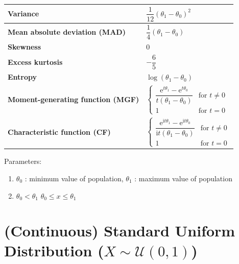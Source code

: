 \begin{alternateColorTable}
\begin{longtable}{|m{6cm}|p{9cm}|}
    \textbf{Variance} &
    ${\displaystyle {\dfrac {1}{12}}(\theta_1-\theta_0)^{2}}$
    \\[1ex] \hline

    \textbf{Mean absolute deviation (MAD)} &
    ${\displaystyle {\dfrac {1}{4}}(\theta_1-\theta_0)}$
    \\[1ex] \hline

    \textbf{Skewness} &
    $0$
    \\ \hline

    \textbf{Excess kurtosis} &
    ${\displaystyle -{\dfrac {6}{5}}}$
    \\[1ex] \hline

    \textbf{Entropy} &
    ${\displaystyle \log(\theta_1-\theta_0)}$
    \\[1ex] \hline

    \textbf{Moment-generating function (MGF)} &
    ${\displaystyle {\begin{cases}{\dfrac {\mathrm {e} ^{t\theta_1}-\mathrm {e} ^{t\theta_0}}{t(\theta_1-\theta_0)}}&{\text{for }}t\neq 0\\1&{\text{for }}t=0\end{cases}}}$
    \\[1ex] \hline

    \textbf{Characteristic function (CF)} &
    ${\displaystyle {\begin{cases}{\dfrac {\mathrm {e} ^{\mathrm {i} t\theta_1}-\mathrm {e} ^{\mathrm {i} t\theta_0}}{\mathrm {i} t(\theta_1-\theta_0)}}&{\text{for }}t\neq 0\\1&{\text{for }}t=0\end{cases}}}$
    \\[1ex] \hline

\end{longtable}
\renewcommand{\arraystretch}{1}
\end{alternateColorTable}


Parameters:
\begin{enumerate}
    \item $\theta_0$ : minimum value of population, $\theta_1$ : maximum value of population

    \item 
        \hfill
        $\theta_0 < \theta_1$
        \hfill
        $\theta_0 \leq x \leq \theta_1$
        \hfill

\end{enumerate}



\section{(Continuous) Standard Uniform Distribution ($X \sim \mathcal{U}(0,1)$) \cite{ism-1}} \label{Standard Uniform Distribution}

